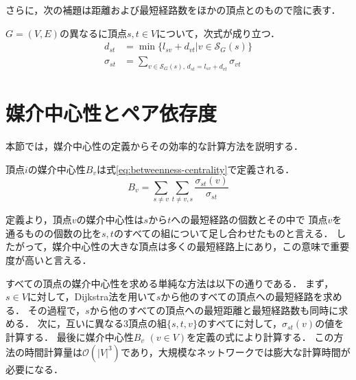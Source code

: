 さらに，次の補題は距離および最短経路数をほかの頂点とのもので陰に表す．

\begin{lemma}
  \label{lemma:distance-and-geodesics}
  $G=(V,E)$の異なるに頂点$s,t\in V$について，次式が成り立つ．
  \begin{equation*}
    \begin{aligned}
      d_{st}&=\min\{l_{sv}+d_{vt}|v\in\mathcal{S}_G(s)\} \\
      \sigma_{st}&=\sum_{v\in\mathcal{S}_G(s),\,d_{st}=l_{sv}+d_{vt}}\sigma_{vt}
    \end{aligned}
  \end{equation*}
\end{lemma}
%

\section{媒介中心性とペア依存度}
\label{sect:pairwise-dependency}

本節では，媒介中心性の定義からその効率的な計算方法を説明する．

\begin{definition}
  \label{def:betweenness-centrality}
  頂点$i$の媒介中心性$B_v$は式\eqref{eq:betweenness-centrality}で定義される．
  \begin{equation}
    B_v=\sum_{s\neq v}\sum_{t\neq {v,s}}\frac{\sigma_{st}(v)}{\sigma_{st}}
    \label{eq:betweenness-centrality}
  \end{equation}
\end{definition}

定義より，頂点$v$の媒介中心性は$s$から$t$への最短経路の個数とその中で
頂点$v$を通るものの個数の比を$s,t$のすべての組について足し合わせたものと言える．
したがって，媒介中心性の大きな頂点は多くの最短経路上にあり，この意味で重要度が高いと言える．

すべての頂点の媒介中心性を求める単純な方法は以下の通りである．
まず，$s\in V$に対して，Dijkstra法を用いて$s$から他のすべての頂点への最短経路を求める．
その過程で，$s$から他のすべての頂点への最短距離と最短経路数も同時に求める．
次に，互いに異なる3頂点の組$\{s,t,v\}$のすべてに対して，$\sigma_{st}(v)$の値を計算する．
最後に媒介中心性$B_v$ $(v\in V)$を定義の式により計算する．
この方法の時間計算量は$\mathcal{O}(|V|^3)$であり，大規模なネットワークでは膨大な計算時間が必要になる．

